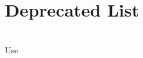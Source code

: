 \chapter{Deprecated List }
\hypertarget{deprecated}{}\label{deprecated}

\begin{DoxyRefList}
\item[{\parbox[t]{\linewidth}{Member \doxylink{structhmap_1_1UvTile_a3a8878fea7b8e8885ab62c31fcc0d4ac}{hmap\+::Uv\+Tile\+::dummy} ()}}]\hfill \\
\label{deprecated__deprecated000001}%
%
Use  
\end{DoxyRefList}